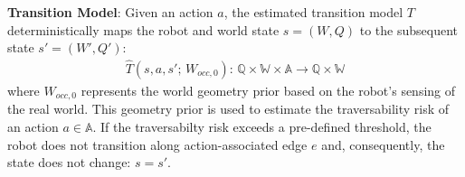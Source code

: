 \documentclass{article}
\newcommand{\ph}[1]{{\textbf{#1}:}} %
\begin{document}










\ph{Transition Model} Given an action $a$, the estimated transition model $T$ deterministically maps the robot and world state $s = (W, Q)$ to the subsequent state $s' = (W', Q')$:
\begin{align}
    \hat{T}(s, a, s'; \, W_{occ,0}): \, \mathbb{Q} \times \mathbb{W} \times \mathbb{A} \rightarrow \mathbb{Q} \times \mathbb{W}
\end{align}
where $W_{occ,0}$ represents the world geometry prior based on the robot's sensing of the real world. This geometry prior is used to estimate the traversability risk of an action $a \in \mathbb{A}$. If the traversabilty risk exceeds a pre-defined threshold, the robot does not transition along action-associated edge $e$ and, consequently, the state does not change: $s = s'$.
\end{document}
